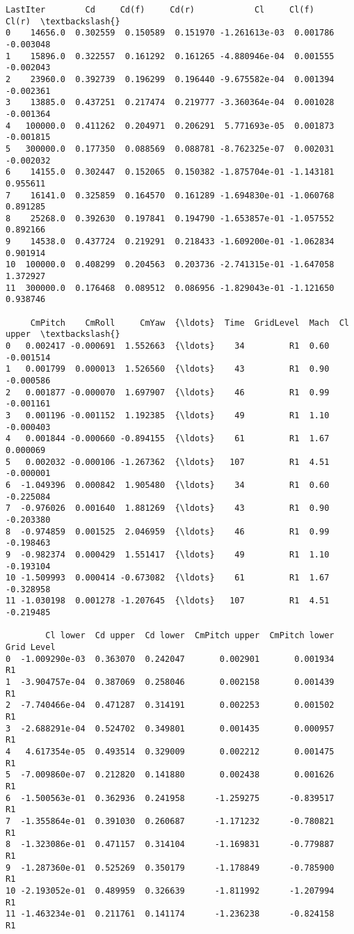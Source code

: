 \documentclass[11pt]{article}
\begin{document}
    \begin{Verbatim}[commandchars=\\\{\}]
    LastIter        Cd     Cd(f)     Cd(r)            Cl     Cl(f)     Cl(r)  \textbackslash{}
0    14656.0  0.302559  0.150589  0.151970 -1.261613e-03  0.001786 -0.003048
1    15896.0  0.322557  0.161292  0.161265 -4.880946e-04  0.001555 -0.002043
2    23960.0  0.392739  0.196299  0.196440 -9.675582e-04  0.001394 -0.002361
3    13885.0  0.437251  0.217474  0.219777 -3.360364e-04  0.001028 -0.001364
4   100000.0  0.411262  0.204971  0.206291  5.771693e-05  0.001873 -0.001815
5   300000.0  0.177350  0.088569  0.088781 -8.762325e-07  0.002031 -0.002032
6    14155.0  0.302447  0.152065  0.150382 -1.875704e-01 -1.143181  0.955611
7    16141.0  0.325859  0.164570  0.161289 -1.694830e-01 -1.060768  0.891285
8    25268.0  0.392630  0.197841  0.194790 -1.653857e-01 -1.057552  0.892166
9    14538.0  0.437724  0.219291  0.218433 -1.609200e-01 -1.062834  0.901914
10  100000.0  0.408299  0.204563  0.203736 -2.741315e-01 -1.647058  1.372927
11  300000.0  0.176468  0.089512  0.086956 -1.829043e-01 -1.121650  0.938746

     CmPitch    CmRoll     CmYaw  {\ldots}  Time  GridLevel  Mach  Cl upper  \textbackslash{}
0   0.002417 -0.000691  1.552663  {\ldots}    34         R1  0.60 -0.001514
1   0.001799  0.000013  1.526560  {\ldots}    43         R1  0.90 -0.000586
2   0.001877 -0.000070  1.697907  {\ldots}    46         R1  0.99 -0.001161
3   0.001196 -0.001152  1.192385  {\ldots}    49         R1  1.10 -0.000403
4   0.001844 -0.000660 -0.894155  {\ldots}    61         R1  1.67  0.000069
5   0.002032 -0.000106 -1.267362  {\ldots}   107         R1  4.51 -0.000001
6  -1.049396  0.000842  1.905480  {\ldots}    34         R1  0.60 -0.225084
7  -0.976026  0.001640  1.881269  {\ldots}    43         R1  0.90 -0.203380
8  -0.974859  0.001525  2.046959  {\ldots}    46         R1  0.99 -0.198463
9  -0.982374  0.000429  1.551417  {\ldots}    49         R1  1.10 -0.193104
10 -1.509993  0.000414 -0.673082  {\ldots}    61         R1  1.67 -0.328958
11 -1.030198  0.001278 -1.207645  {\ldots}   107         R1  4.51 -0.219485

        Cl lower  Cd upper  Cd lower  CmPitch upper  CmPitch lower  Grid Level
0  -1.009290e-03  0.363070  0.242047       0.002901       0.001934          R1
1  -3.904757e-04  0.387069  0.258046       0.002158       0.001439          R1
2  -7.740466e-04  0.471287  0.314191       0.002253       0.001502          R1
3  -2.688291e-04  0.524702  0.349801       0.001435       0.000957          R1
4   4.617354e-05  0.493514  0.329009       0.002212       0.001475          R1
5  -7.009860e-07  0.212820  0.141880       0.002438       0.001626          R1
6  -1.500563e-01  0.362936  0.241958      -1.259275      -0.839517          R1
7  -1.355864e-01  0.391030  0.260687      -1.171232      -0.780821          R1
8  -1.323086e-01  0.471157  0.314104      -1.169831      -0.779887          R1
9  -1.287360e-01  0.525269  0.350179      -1.178849      -0.785900          R1
10 -2.193052e-01  0.489959  0.326639      -1.811992      -1.207994          R1
11 -1.463234e-01  0.211761  0.141174      -1.236238      -0.824158          R1


\end{Verbatim}
\end{document}
